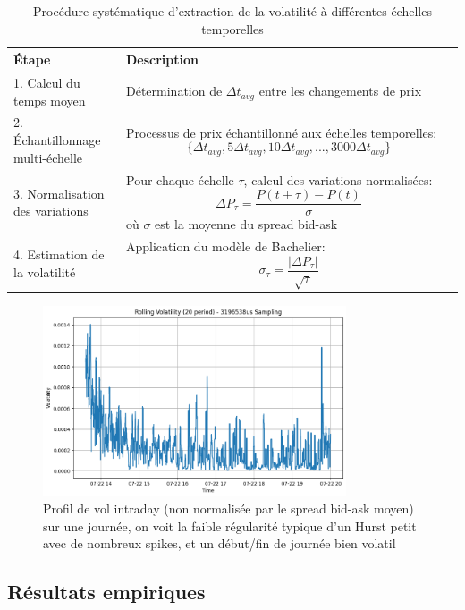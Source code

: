 \documentclass[10pt,a4paper]{article}
\theoremstyle{definition}
\theoremstyle{remark}
\begin{document}
\begin{itemize}
\begin{landscape}
\begin{table}[h!]
\centering
\begin{tabular}{|p{0.25\linewidth}|p{0.75\linewidth}|}
\hline
\textbf{Étape} & \textbf{Description} \\
\hline
1. Calcul du temps moyen & Détermination de \(\Delta t_{avg}\) entre les changements de prix \\
\hline
2. Échantillonnage multi-échelle & Processus de prix échantillonné aux échelles temporelles: \[\{\Delta t_{avg}, 5\Delta t_{avg}, 10\Delta t_{avg}, ..., 3000\Delta t_{avg}\}\] \\
\hline
3. Normalisation des variations & Pour chaque échelle \(\tau\), calcul des variations normalisées: \[\Delta P_{\tau} = \frac{P(t+\tau) - P(t)}{\sigma}\] où \(\sigma\) est la moyenne du spread bid-ask \\
\hline
4. Estimation de la volatilité & Application du modèle de Bachelier: \[\sigma_{\tau} = \frac{|\Delta P_{\tau}|}{\sqrt{\tau}}\] \\
\hline
\end{tabular}
\caption{Procédure systématique d'extraction de la volatilité à différentes échelles temporelles}
\label{tab:volatility_extraction}
\end{table}
\end{landscape}


\begin{figure}[H]
    \centering
    \includegraphics[width=0.8\textwidth]{rollingvola.png}
    \caption{Profil de vol intraday (non normalisée par le spread bid-ask moyen) sur une journée, on voit la faible régularité typique d'un Hurst petit avec de nombreux spikes, et un début/fin de journée bien volatil}
    \label{fig:jump_example_1}
\end{figure}

\subsection{Résultats empiriques}


\end{itemize}
\end{document}
